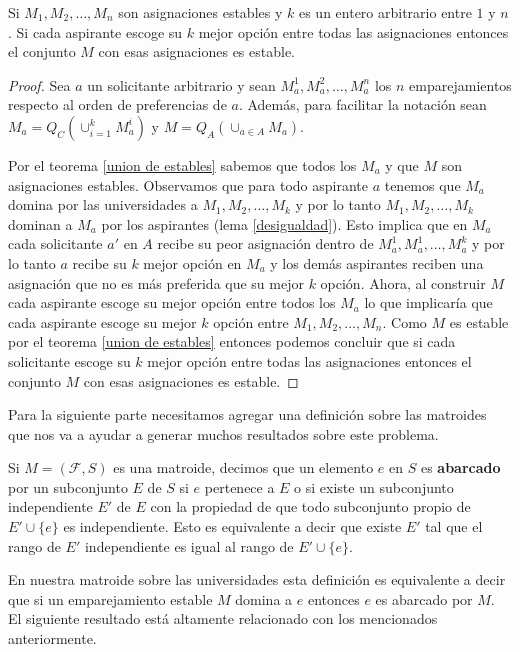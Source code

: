 \begin{teo}
Si $M_1,M_2,\dots,M_n$ son asignaciones estables y $k$ es un entero arbitrario entre $1$ y $n$. Si cada aspirante escoge su $k$ mejor opción entre todas las asignaciones entonces el conjunto $M$ con esas asignaciones es estable. 
\end{teo}
\begin{proof}
Sea $a$ un solicitante arbitrario y sean $M_a^1,M_a^2,\dots,M_a^n$ los $n$ emparejamientos respecto al orden de preferencias de $a$. Además, para facilitar la notación sean $M_a = Q_C(\cup_{i=1}^kM_a^i)$ y $M=Q_A( \cup_{a \in A} M_a)$.

Por el teorema \ref{union de estables} sabemos que todos los $M_a$ y que $M$ son asignaciones estables. Observamos que para todo aspirante $a$ tenemos que $M_a$ domina por las universidades a $M_1,M_2,\dots,M_k$ y por lo tanto $M_1,M_2,\dots,M_k$ dominan a $M_a$ por los aspirantes (lema \ref{desigualdad}). Esto implica que en $M_a$ cada solicitante $a'$ en $A$ recibe su peor asignación dentro de $M_a^1,M_a^1,\dots,M_a^k$ y por lo tanto $a$ recibe su $k$ mejor opción en $M_a$ y los demás aspirantes reciben una asignación que no es más preferida que su mejor $k$ opción. Ahora, al construir $M$ cada aspirante escoge su mejor opción entre todos los $M_a$ lo que implicaría que cada aspirante escoge su mejor $k$ opción entre $M_1,M_2,\dots,M_n$. Como $M$ es estable por el teorema \ref{union de estables} entonces podemos concluir que si cada solicitante escoge su $k$ mejor opción entre todas las asignaciones entonces el conjunto $M$ con esas asignaciones es estable.
\end{proof}

Para la siguiente parte necesitamos agregar una definición sobre las matroides que nos va a ayudar a generar muchos resultados sobre este problema.

\begin{dfn}
Si $M=(\mathcal{F},S)$ es una matroide, decimos que un elemento $e$ en $S$ es \textbf{abarcado} por un subconjunto $E$ de $S$ si $e$ pertenece a $E$ o si existe un subconjunto independiente $E'$ de $E$ con la propiedad de que todo subconjunto propio de $E' \cup \{e\}$ es independiente. Esto es equivalente a decir que existe $E'$ tal que el rango de $E'$ independiente es igual al rango de $E' \cup \{e\}$. 
\end{dfn}

En nuestra matroide sobre las universidades esta definición es equivalente a decir que si un emparejamiento estable $M$ domina a $e$ entonces $e$ es abarcado por $M$. El siguiente resultado está altamente relacionado con los mencionados anteriormente. 

